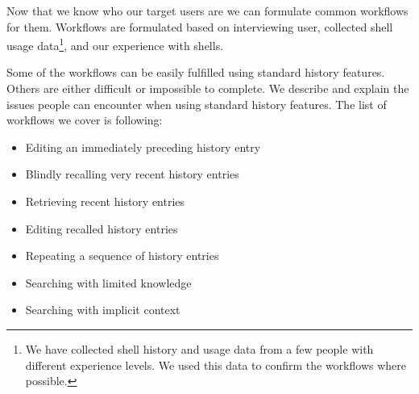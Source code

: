 Now that we know who our target users are we can formulate common workflows for them. Workflows are formulated based on interviewing user, collected shell usage data\footnote{We have collected shell history and usage data from a few people with different experience levels. We used this data to confirm the workflows where possible.}, and our experience with shells. 

Some of the workflows can be easily fulfilled using standard history features. Others are either difficult or impossible to complete. We describe and explain the issues people can encounter when using standard history features. The list of workflows we cover is following:








\begin{itemize}
    \item Editing an immediately preceding history entry
    \item Blindly recalling very recent history entries
    \item Retrieving recent history entries
    \item Editing recalled history entries
    \item Repeating a sequence of history entries
    \item Searching with limited knowledge
    \item Searching with implicit context
\end{itemize}


